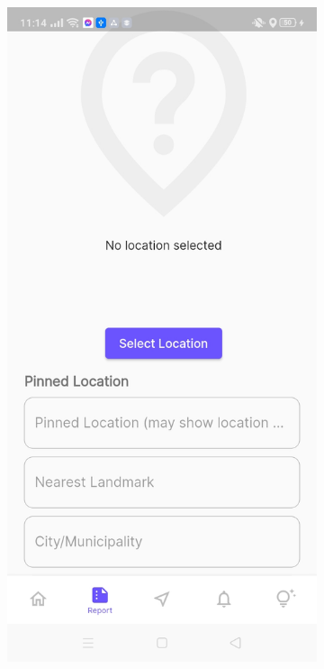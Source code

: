 \begin{figure}[!h]
\begin{subfigure}[c]{0.30\linewidth}
    \end{subfigure}
    \centering
    \begin{subfigure}[c]{0.30\linewidth}
        \centering
        \includegraphics[scale=0.15]{figures/Chapter4/Main/p5-2.jpg}

\end{subfigure}
\end{figure}
